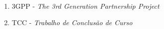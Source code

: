 \begin{enumerate}
  \item 3GPP - \textit{The 3rd Generation Partnership Project}

  \item TCC - \textit{Trabalho de Conclusão de Curso}

\end{enumerate}
